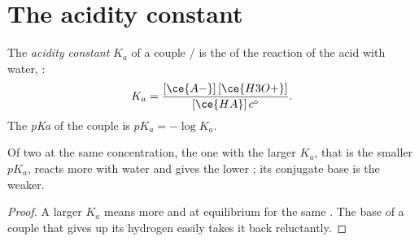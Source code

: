 \section{The acidity constant}

\begin{definition}\label{def:g12:ka-and-pka:ka}
The \emph{acidity constant} $K_a$ of a couple
/ is the  of the reaction of the acid
with water, :
\[
  K_a = \frac{[\ce{A-}]\,[\ce{H3O+}]}{[\ce{HA}]\,c^\circ} .
\]
The \emph{pKa} of the couple is
$pK_a = -\log K_a$.
\end{definition}

\begin{proposition}\label{prop:g12:ka-and-pka:compare}
Of two  at the same concentration, the one with the larger
$K_a$, that is the smaller $pK_a$, reacts more with water and gives the
lower ; its conjugate base is the weaker.
\end{proposition}

\begin{proof}
A larger $K_a$ means more  and  at equilibrium for the
same . The base  of a couple that gives up its hydrogen 
easily takes it back reluctantly.
\end{proof}

